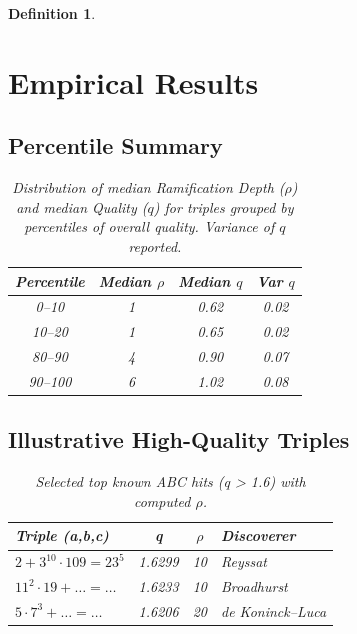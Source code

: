 \documentclass[11pt,a4paper]{article}
\newtheorem{definition}{Definition}[section]
\begin{document}
\begin{definition}
\section{Empirical Results}
\subsection{Percentile Summary}
\begin{table}[h!]
\centering
\caption{Distribution of median Ramification Depth ($\rho$) and median Quality ($q$) for triples grouped by percentiles of overall quality. Variance of $q$ reported.}
\begin{tabular}{c c c c}
\toprule
Percentile & Median $\rho$ & Median $q$ & Var $q$ \\
\midrule
0--10 & 1 & 0.62 & 0.02 \\
10--20 & 1 & 0.65 & 0.02 \\
80--90 & 4 & 0.90 & 0.07 \\
90--100 & 6 & 1.02 & 0.08 \\
\bottomrule
\end{tabular}
\label{tab:percentiles}
\end{table}
\subsection{Illustrative High-Quality Triples}
\begin{table}[h!]
\centering
\caption{Selected top known ABC hits (q > 1.6) with computed $\rho$.}
\begin{tabular}{l c c l}
\toprule
Triple (a,b,c) & q & $\rho$ & Discoverer \\
\midrule
$2 + 3^{10}\cdot 109 = 23^5$ & 1.6299 & 10 & Reyssat \\
$11^2\cdot 19 + \dots = \dots$ & 1.6233 & 10 & Broadhurst \\
$5\cdot7^3 + \dots = \dots$ & 1.6206 & 20 & de Koninck--Luca \\
\bottomrule
\end{tabular}
\label{tab:top-hits}
\end{table}

\end{definition}
\end{document}
